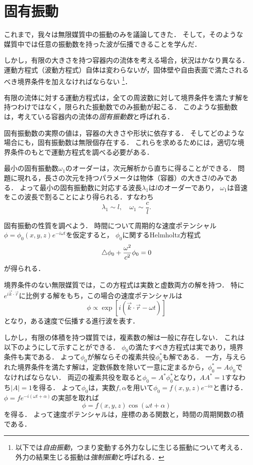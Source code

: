 \section{固有振動}

これまで，我々は無限媒質中の振動のみを議論してきた．
そして，そのような媒質中では任意の振動数を持った波が伝播できることを学んだ．

しかし，有限の大きさを持つ容器内の流体を考える場合，状況はかなり異なる．
運動方程式（波動方程式）自体は変わらないが，固体壁や自由表面で満たされるべき境界条件を加えなければならない
\footnote{以下では\emph{自由振動}，つまり変動する外力なしに生じる振動について考える．
外力の結果生じる振動は\emph{強制振動}と呼ばれる．}．


有限の流体に対する運動方程式は，全ての周波数に対して境界条件を満たす解を持つわけではなく，限られた振動数でのみ振動が起こる．
このような振動数は，考えている容器内の流体の\emph{固有振動数}と呼ばれる．


固有振動数の実際の値は，容器の大きさや形状に依存する．
そしてどのような場合にも，固有振動数は無限個存在する．
これらを求めるためには，適切な境界条件のもとで運動方程式を調べる必要がある．


最小の固有振動数$\omega_1$のオーダーは，次元解析から直ちに得ることができる．
問題に現れる，長さの次元を持つパラメータは物体（容器）の大きさ$l$のみである．
よって最小の固有振動数に対応する波長$\lambda_1$は$l$のオーダーであり，
$\omega_1$は音速をこの波長で割ることにより得られる．すなわち
\begin{equation}
    \lambda_1 \sim l, \quad 
    \omega_1 \sim \frac{c}{l}.
\end{equation}


固有振動の性質を調べよう．
時間について周期的な速度ポテンシャル$\phi = \phi_0(x,y,z) e^{-i\omega t}$を仮定すると，
$\phi_0$に関するHelmholtz方程式
\begin{equation}
    \triangle \phi_0 + \frac{\omega^2}{c^2} \phi_0 = 0
\end{equation}
が得られる．


境界条件のない無限媒質では，この方程式は実数と虚数両方の解を持つ．
特に$e^{i \vec{k}\cdot\vec{r}}$に比例する解をもち，この場合の速度ポテンシャルは
\[
    \phi \propto \exp[ i(\vec{k}\cdot\vec{r}-\omega t) ]
\]
となり，ある速度で伝播する進行波を表す．


しかし，有限の体積を持つ媒質では，複素数の解は一般に存在しない．
これは以下のようにして示すことができる．
$\phi_0$の満たすべき方程式は実であり，境界条件も実である．
よって$\phi_0$が解ならその複素共役$\phi_0^*$も解である．
一方，与えられた境界条件を満たす解は，定数係数を除いて一意に定まるから，$\phi_0^* = A\phi_0$でなければならない．
両辺の複素共役を取ると$\phi_0 = A^* \phi_0^*$となり，$AA^*=1$すなわち$|A|=1$を得る．
よって$\phi_0$は，実数$f,\alpha$を用いて$\phi_0 = f(x,y,z)e^{-i\alpha}$と書ける．
$\phi = f e^{-i(\omega t + \alpha)}$の実部を取れば
\begin{equation}\label{eq69.3:定在波のポテンシャルの一般形}
    \phi = f(x,y,z) \cos(\omega t + \alpha)
\end{equation}
を得る．
よって速度ポテンシャルは，座標のある関数と，時間の周期関数の積である．


